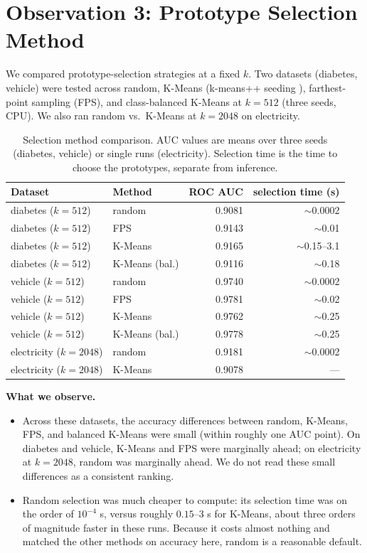 \documentclass[11pt,a4paper]{article}
\begin{document}
\section{Observation 3: Prototype Selection Method}

We compared prototype-selection strategies at a fixed $k$. Two datasets
(diabetes, vehicle) were tested across random, K-Means (k-means++ seeding
\cite{arthur2007kmeans}), farthest-point sampling (FPS), and class-balanced
K-Means at $k{=}512$ (three seeds, CPU). We also ran random vs.\ K-Means at
$k{=}2048$ on electricity.

\begin{table}[h]
\centering
\caption{Selection method comparison. AUC values are means over three seeds
(diabetes, vehicle) or single runs (electricity). Selection time is the time to
choose the prototypes, separate from inference.}
\label{tab:selection}
\begin{tabular}{llrr}
\toprule
Dataset & Method & ROC AUC & selection time (s) \\
\midrule
diabetes ($k{=}512$) & random          & 0.9081 & $\sim$0.0002 \\
diabetes ($k{=}512$) & FPS             & 0.9143 & $\sim$0.01 \\
diabetes ($k{=}512$) & K-Means         & 0.9165 & $\sim$0.15--3.1 \\
diabetes ($k{=}512$) & K-Means (bal.)  & 0.9116 & $\sim$0.18 \\
\midrule
vehicle ($k{=}512$)  & random          & 0.9740 & $\sim$0.0002 \\
vehicle ($k{=}512$)  & FPS             & 0.9781 & $\sim$0.02 \\
vehicle ($k{=}512$)  & K-Means         & 0.9762 & $\sim$0.25 \\
vehicle ($k{=}512$)  & K-Means (bal.)  & 0.9778 & $\sim$0.25 \\
\midrule
electricity ($k{=}2048$) & random      & 0.9181 & $\sim$0.0002 \\
electricity ($k{=}2048$) & K-Means      & 0.9078 & --- \\
\bottomrule
\end{tabular}
\end{table}

\textbf{What we observe.}
\begin{itemize}
\item Across these datasets, the accuracy differences between random, K-Means,
FPS, and balanced K-Means were small (within roughly one AUC point). On diabetes
and vehicle, K-Means and FPS were marginally ahead; on electricity at
$k{=}2048$, random was marginally ahead. We do not read these small differences
as a consistent ranking.
\item Random selection was much cheaper to compute: its selection time was on
the order of $10^{-4}$ s, versus roughly $0.15$--$3$ s for K-Means, about three
orders of magnitude faster in these runs. Because it costs almost nothing and
matched the other methods on accuracy here, random is a reasonable default.
\end{itemize}
\end{document}
